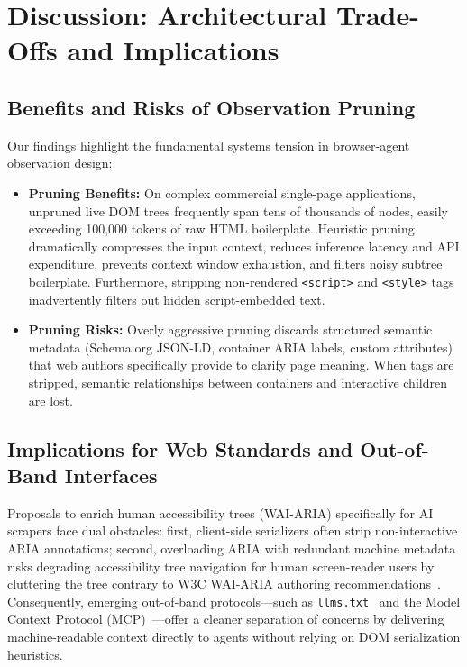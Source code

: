 \documentclass[11pt,a4paper]{article}
\begin{document}
\section{Discussion: Architectural Trade-Offs and Implications}
\label{sec:discussion}

\subsection{Benefits and Risks of Observation Pruning}
Our findings highlight the fundamental systems tension in browser-agent observation design:
\begin{itemize}
    \item \textbf{Pruning Benefits:} On complex commercial single-page applications, unpruned live DOM trees frequently span tens of thousands of nodes, easily exceeding 100,000 tokens of raw HTML boilerplate. Heuristic pruning dramatically compresses the input context, reduces inference latency and API expenditure, prevents context window exhaustion, and filters noisy subtree boilerplate. Furthermore, stripping non-rendered \texttt{<script>} and \texttt{<style>} tags inadvertently filters out hidden script-embedded text.
    \item \textbf{Pruning Risks:} Overly aggressive pruning discards structured semantic metadata (Schema.org JSON-LD, container ARIA labels, custom attributes) that web authors specifically provide to clarify page meaning. When tags are stripped, semantic relationships between containers and interactive children are lost.
\end{itemize}

\subsection{Implications for Web Standards and Out-of-Band Interfaces}
Proposals to enrich human accessibility trees (WAI-ARIA) specifically for AI scrapers face dual obstacles: first, client-side serializers often strip non-interactive ARIA annotations; second, overloading ARIA with redundant machine metadata risks degrading accessibility tree navigation for human screen-reader users by cluttering the tree contrary to W3C WAI-ARIA authoring recommendations~\cite{wai_aria12}. Consequently, emerging out-of-band protocols---such as \texttt{llms.txt}~\cite{llmstxt2024} and the Model Context Protocol (MCP)~\cite{mcp2024}---offer a cleaner separation of concerns by delivering machine-readable context directly to agents without relying on DOM serialization heuristics.
\end{document}
